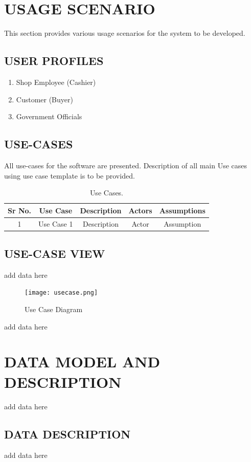 \documentclass[12pt,a4paper]{report}
\begin{document}
\section{USAGE SCENARIO}
This section provides various usage scenarios for the system to be developed.   
\subsection{USER PROFILES}
\begin{enumerate}
\item Shop Employee (Cashier)
\item Customer (Buyer)
\item Government Officials
\end{enumerate}

\subsection{USE-CASES}
All use-cases for the software are presented. Description of all main Use cases using use case template is to be provided.\\

\begin{table}[H]
\centering
\begin{tabular}{|c|c|c|c|c|}
\hline Sr No. & Use Case & Description & Actors & Assumptions\\
\hline 1 & Use Case 1 & Description & Actor & Assumption\\
\hline
\end{tabular}
\caption{ Use Cases.}
\label{tab:usec}
\end{table}

\subsection{USE-CASE VIEW}
add data here 
\begin{figure}[H]
\begin{center}
\texttt{[image: usecase.png]}
\end{center}
\caption{Use Case Diagram}
\label{tab:usecd}
\end{figure}

add data here


\section{DATA MODEL AND DESCRIPTION}
add data here
\subsection{DATA DESCRIPTION}
add data here
\end{document}
